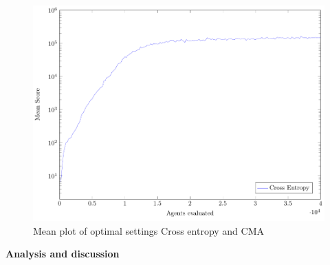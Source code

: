 \begin{figure}[H]
\centering
\includegraphics[scale=1]{data/TunedComparison/mean_CE_CMA/PlotFile.pdf}
\caption{Mean plot of optimal settings Cross entropy and CMA}
\end{figure}


\textbf{Analysis and discussion}\\

